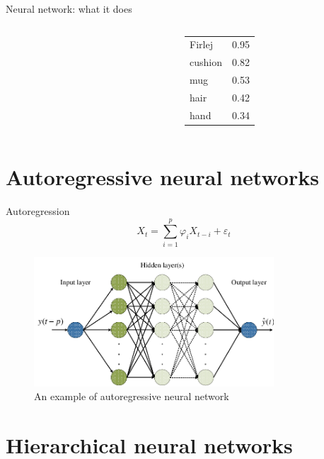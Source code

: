 \documentclass{beamer}
\begin{document}
\begin{frame}{Neural network: what it does}
\begin{columns}
\begin{column}{0.3\textwidth}
\begin{figure}
            \end{figure}\pause
        \end{column}
        \begin{column}{0.2\textwidth}
            \begin{tabular}{ll}
                Firlej & 0.95 \\
                cushion & 0.82 \\
                mug & 0.53 \\
                hair & 0.42 \\
                hand & 0.34
            \end{tabular}
        \end{column}
    \end{columns}
\end{frame}


\section{Autoregressive neural networks}

\begin{frame}{Autoregression}
    $$X_t = \sum_{i=1}^p \varphi_i X_{t-i} + \varepsilon_t$$
    \begin{figure}
        \centering
        \includegraphics[width=0.8\textwidth]{ann.png}
        \caption{An example of autoregressive neural network}
    \end{figure}
    
\end{frame}

\section{Hierarchical neural networks}
\end{document}
